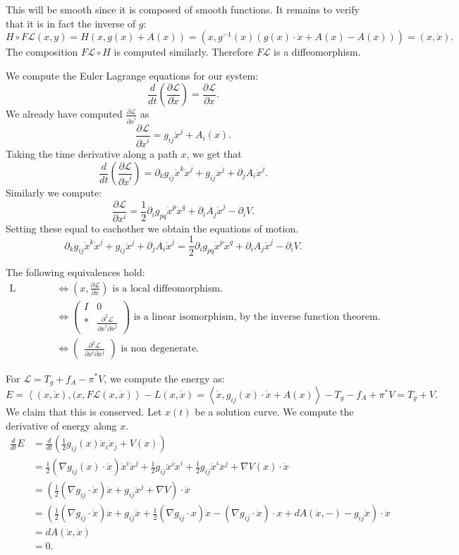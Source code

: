\documentclass[12pt, a4paper]{article}
\theoremstyle{definition}
\newcommand{\eL}{\mathcal{L}}                         %
\newcommand{\grad}{\nabla}
\newcommand{\lan}{\left\langle}
\newcommand{\ran}{\right\rangle}
\newcommand{\inn}[1]{\lan#1\ran}
\newcommand{\pmat}[1]{\begin{pmatrix}#1\end{pmatrix}}
\begin{document}
This will be smooth since it is composed of smooth functions. It remains to verify that it is in fact the inverse of $g$:
$$H\circ F \eL(x,y) = H ( x, g(x) + A(x)) =(x , g^{-1}(x) \left(g(x) \cdot \dot{x} + A(x) - A(x) \right))  = (x, \dot{x}).$$
The composition $F \eL \circ H$ is computed similarly. Therefore $F \eL$ is a diffeomorphism. 
\item We compute the Euler Lagrange equations for our system: 
	$$\frac{d}{dt} \left( \frac{\partial \eL}{\partial \dot{x}} \right) = \frac{\partial \eL}{\partial x}.$$
	We already have computed $\frac{\partial \eL}{\partial \dot{x}^i}$ as
	$$ \frac{\partial \eL}{\partial \dot{x}^i} = g_{ij}  \dot{x}^j + A_i(x).$$
Taking the time derivative along a path $x$, we get that 
$$\frac{d}{dt} \left(\frac{\partial \eL}{\partial \dot{x}^i} \right) =\partial_k g_{ij}\dot{x}^k \dot{x}^j +g_{ij}\ddot{x}^{j} + \partial_j A_i \dot{x}^j.$$
Similarly we compute: 
$$\frac{\partial \eL}{\partial x^i} = \frac{1}{2} \partial_i g_{pq} \dot{x}^p \dot{x}^q +\partial_i A_j \dot{x}^j - \partial_i V.$$
Setting these equal to eachother we obtain the equations of motion. 
$$\partial_k g_{ij}\dot{x}^k \dot{x}^j +g_{ij}\ddot{x}^{j} + \partial_j A_i \dot{x}^j=\frac{1}{2} \partial_i g_{pq} \dot{x}^p \dot{x}^q + \partial_i A_j \dot{x}^j - \partial_i V. $$
\item The following equivalences hold: 
\begin{align*}
	  \text{L regular} & \iff \left(x, \frac{\partial \eL}{\partial \dot{x}}  \right)\text{ is a local diffeomorphism.}
	 \\ & \iff \pmat{I & 0 \\ * & \frac{\partial^2 \eL}{\partial \dot{x}^i \partial \dot{x}^j}}
	 \text{ is a linear isomorphism, by the inverse function theorem.}
	 \\ & \iff \pmat{\frac{\partial^2 \eL}{\partial {x}^i \partial {x}^j}} \text{ is non degenerate.}
\end{align*}
\item For $\eL = T_g + f_A - \pi^\ast V$, we compute the energy as:
$$E = \inn{(x, \dot{x}), (x, F \eL(x, \dot{x})} - L(x, \dot{x})=\inn{\dot{x}, g_{ij}(x) \cdot \dot{x} + A(x)} - T_g - f_A + \pi^\ast V = T_g +V. $$
We claim that this is conserved. Let $x(t)$ be a solution curve. We compute the derivative of energy along $x$. 
\begin{align*}
	\frac{d}{dt}E & = \frac{d}{dt} \left( \frac{1}{2}g_{ij}(x) \dot{x}_i \dot{x}_j + V(x) \right)
	\\ & = \frac{1}{2} \left(\grad g_{ij} (x) \cdot \dot{x} \right)\dot{x}^i \dot{x}^j+ \frac{1}{2} g_{ij}\ddot{x}^i \dot{x}^i + \frac{1}{2}g_{ij}\dot{x}^i \ddot{x}^j +  \grad V(x) \cdot \dot{x}
	\\ & = \left( \frac{1}{2}(\grad g_{ij}\cdot \dot{x}) \dot{x} + g_{ij}\ddot{x}^j + \grad V\right)\cdot \dot{x}
	\\ & = \left(  \frac{1}{2}(\grad g_{ij}\cdot \dot{x}) \dot{x} + g_{ij}\ddot{x} + \frac{1}{2}(\grad g_{ij} \cdot{x})\dot{x} - (\grad g_{ij} \cdot \dot{x}) \cdot{x} + dA(\dot{x}, -) - g_{ij}\ddot{x}   \right) \cdot \dot{x} \tag{By Substituting EoM}
	\\ & = dA(\dot{x}, \dot{x})
	\\ & = 0.
\end{align*}
\end{document}
